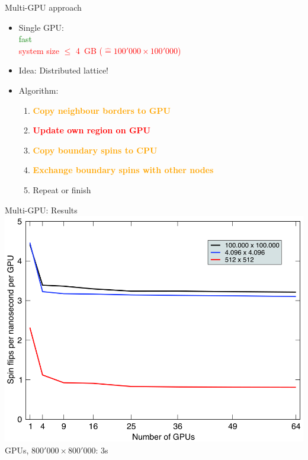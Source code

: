 \documentclass{beamer}
\begin{document}
\begin{frame}{Multi-GPU approach}
\begin{itemize}
    \item Single GPU:\\
        \textcolor{green}{fast}\\ \pause
        \textcolor{red}{system size $\le$ 4~GB ($\mathrel{\widehat{=}} 100'000 \times 100'000$)} \pause
    \item Idea: Distributed lattice! \pause
    \item Algorithm:
        \begin{enumerate}
            \item \textcolor{orange}{\textbf{Copy neighbour borders to GPU}} \pause
            \item \textcolor{red}{\textbf{Update own region on GPU}} \pause
            \item \textcolor{orange}{\textbf{Copy boundary spins to CPU}} \pause
            \item \textcolor{orange}{\textbf{Exchange boundary spins with other nodes}} \pause
            \item Repeat or finish
        \end{enumerate}
\end{itemize}
\end{frame}

\begin{frame}{Multi-GPU: Results}
\includegraphics[keepaspectratio=true, width=\textwidth]{images/results2.png} \\  GPUs, $800'000 \times 800'000$: 3s
\end{frame}
\end{document}

